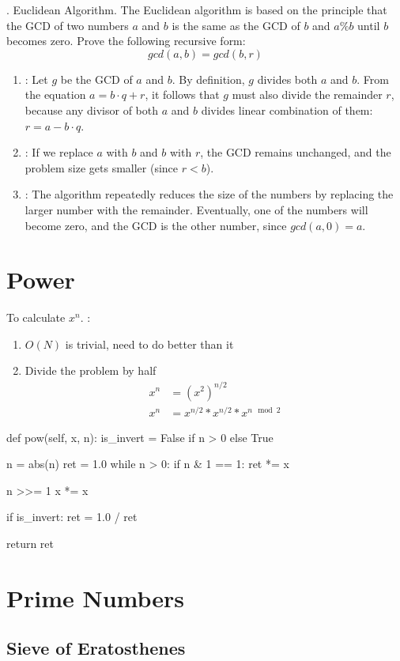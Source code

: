 . Euclidean Algorithm. The Euclidean algorithm is based on the principle that the GCD of two numbers $a$ and $b$ is the same as the GCD of $b$ and $a\%b$ until $b$ becomes zero. Prove the following recursive form:
$$
gcd(a,b) = gcd(b, r)
$$
\begin{enumerate}
\item {}: Let $g$ be the GCD of $a$ and $b$. By definition, $g$ divides both $a$ and $b$. From the equation $a=b\cdot q+r$, it follows that $g$ must also divide the remainder $r$, because any divisor of both $a$ and $b$ divides linear combination of them: $r = a - b \cdot q$. 
\item {}: If we replace $a$ with $b$ and $b$ with $r$, the GCD remains unchanged, and the problem size gets smaller (since $r<b$). 
\item {}: The algorithm repeatedly reduces the size of the numbers by replacing the larger number with the remainder. Eventually, one of the numbers will become zero, and the GCD is the other number, since $gcd(a,0)=a$.
\end{enumerate}
\section{Power}
 To calculate $x^n$. 
:
\begin{enumerate}
\item $O(N)$ is trivial, need to do better than it
\item Divide the problem by half
\begin{align*}
x^n &= (x^2)^{n/2} \\
x^n &= x^{n/2} * x^{n/2} * x^{n \mod 2}
\end{align*}
\end{enumerate}
\begin{python}
def pow(self, x, n):
    is_invert = False if n > 0 else True

    n = abs(n)
    ret = 1.0
    while n > 0:
        if n & 1 == 1:
            ret *= x

        n >>= 1
        x *= x

    if is_invert:
        ret = 1.0 / ret

    return ret
\end{python}
\section{Prime Numbers}
\subsection{Sieve of Eratosthenes}
